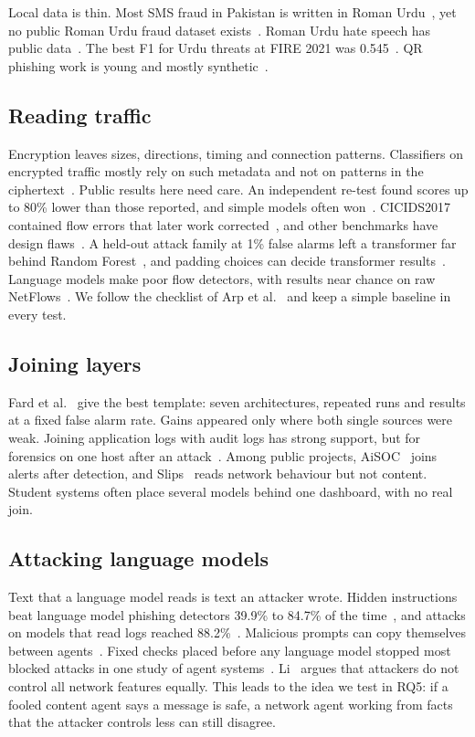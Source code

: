 Local data is thin. Most SMS fraud in Pakistan is written in Roman Urdu~\cite{pervaiz}, yet no public Roman Urdu fraud dataset exists~\cite{ayaz}. Roman Urdu hate speech has public data~\cite{ruhsold}. The best F1 for Urdu threats at FIRE 2021 was 0.545~\cite{fire}. QR phishing work is young and mostly synthetic~\cite{trad}.

\subsection{Reading traffic}

Encryption leaves sizes, directions, timing and connection patterns. Classifiers on encrypted traffic mostly rely on such metadata and not on patterns in the ciphertext~\cite{wickramasinghe}. Public results here need care. An independent re-test found scores up to 80\% lower than those reported, and simple models often won~\cite{zhao}. CICIDS2017~\cite{cicids} contained flow errors that later work corrected~\cite{engelen}, and other benchmarks have design flaws~\cite{flood}. A held-out attack family at 1\% false alarms left a transformer far behind Random Forest~\cite{zaro}, and padding choices can decide transformer results~\cite{moczkodan}. Language models make poor flow detectors, with results near chance on raw NetFlows~\cite{houssel}. We follow the checklist of Arp et al.~\cite{arp} and keep a simple baseline in every test.

\subsection{Joining layers}

Fard et al.~\cite{fard} give the best template: seven architectures, repeated runs and results at a fixed false alarm rate. Gains appeared only where both single sources were weak. Joining application logs with audit logs has strong support, but for forensics on one host after an attack~\cite{alchemist}. Among public projects, AiSOC~\cite{aisoc} joins alerts after detection, and Slips~\cite{slips} reads network behaviour but not content. Student systems often place several models behind one dashboard, with no real join.

\subsection{Attacking language models}

Text that a language model reads is text an attacker wrote. Hidden instructions beat language model phishing detectors 39.9\% to 84.7\% of the time~\cite{clouding}, and attacks on models that read logs reached 88.2\%~\cite{loginject}. Malicious prompts can copy themselves between agents~\cite{promptinfection}. Fixed checks placed before any language model stopped most blocked attacks in one study of agent systems~\cite{mitra}. Li~\cite{li2026} argues that attackers do not control all network features equally. This leads to the idea we test in RQ5: if a fooled content agent says a message is safe, a network agent working from facts that the attacker controls less can still disagree.

